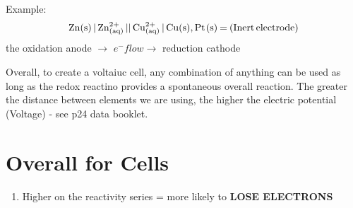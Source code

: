 \documentclass{article}
\begin{document}
\begin{enumerate}
Example: $$\ce{Zn(s) | Zn^{2+}_{(aq)} || Cu^{2+}_{(aq)} | Cu(s), Pt(s) = (Inert electrode)}$$
the oxidation anode $\rightarrow$ $e^{-} flow \rightarrow$ reduction cathode


Overall, to create a voltaiuc cell, any combination of anything can be used as long as the redox reactino provides a spontaneous overall reaction. The greater the distance between elements we are using, the higher the electric potential (Voltage) - see p24 data booklet.

\end{enumerate}

\section{Overall for Cells}
\begin{enumerate}
\item Higher on the reactivity series = more likely to \textbf{LOSE ELECTRONS}
\end{enumerate}
\end{document}
